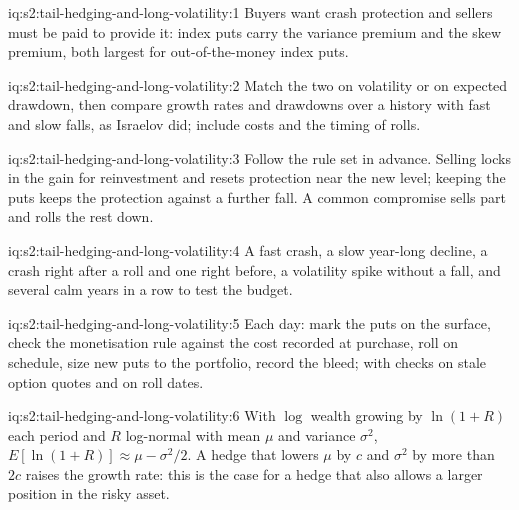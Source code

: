 \begin{solution}{iq:s2:tail-hedging-and-long-volatility:1}
Buyers want crash protection and sellers must be paid to provide it: index puts carry the variance premium and the skew premium, both largest for
out-of-the-money index puts.
\end{solution}

\begin{solution}{iq:s2:tail-hedging-and-long-volatility:2}
Match the two on volatility or on expected drawdown, then compare growth rates and drawdowns over a history with fast and slow falls, as Israelov did;
include costs and the timing of rolls.
\end{solution}

\begin{solution}{iq:s2:tail-hedging-and-long-volatility:3}
Follow the rule set in advance. Selling locks in the gain for reinvestment and resets protection near the new level; keeping the puts keeps the
protection against a further fall. A common compromise sells part and rolls the rest down.
\end{solution}

\begin{solution}{iq:s2:tail-hedging-and-long-volatility:4}
A fast crash, a slow year-long decline, a crash right after a roll and one right before, a volatility spike without a fall, and several calm years in a
row to test the budget.
\end{solution}

\begin{solution}{iq:s2:tail-hedging-and-long-volatility:5}
Each day: mark the puts on the surface, check the monetisation rule against the cost recorded at purchase, roll on schedule, size new puts to the
portfolio, record the bleed; with checks on stale option quotes and on roll dates.
\end{solution}

\begin{solution}{iq:s2:tail-hedging-and-long-volatility:6}
With $\log$ wealth growing by $\ln(1 + R)$ each period and $R$ log-normal with mean $\mu$ and variance $\sigma^2$, $E[\ln(1 + R)] \approx \mu -
\sigma^2/2$. A hedge that lowers $\mu$ by $c$ and $\sigma^2$ by more than $2c$ raises the growth rate: this is the case for a hedge that also allows a
larger position in the risky asset.
\end{solution}
